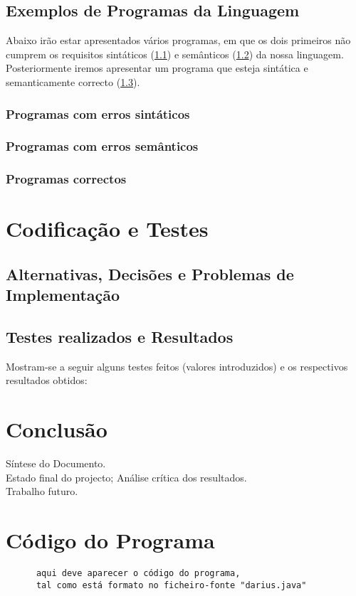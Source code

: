 \documentclass{report}
\begin{document}
\section{Exemplos de Programas da Linguagem}
Abaixo irão estar apresentados vários programas, em que os dois primeiros não cumprem os requisitos sintáticos (\ref{esint}) e semânticos (\ref{esem}) da nossa linguagem. Posteriormente iremos apresentar um programa que esteja sintática e semanticamente correcto (\ref{pc}).
\subsection{Programas com erros sintáticos}\label{esint}

\subsection{Programas com erros semânticos}\label{esem}

\subsection{Programas correctos}\label{pc}


\chapter{Codificação e Testes} \label {code}
\section{Alternativas, Decisões e Problemas de Implementação}
\section{Testes realizados e Resultados}
Mostram-se a seguir alguns testes feitos (valores introduzidos) e
os respectivos resultados obtidos:


\chapter{Conclusão} \label {conc}
Síntese do Documento.\\
Estado final do projecto; Análise crítica dos resultados.\\
Trabalho futuro.

\appendix
\chapter{Código do Programa}


\begin{verbatim}
      aqui deve aparecer o código do programa,
      tal como está formato no ficheiro-fonte "darius.java"
\end{verbatim}
\end{document}
